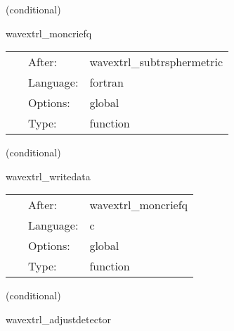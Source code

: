 \vspace{5mm}

   (conditional) 

\hspace{5mm} wavextrl\_moncriefq 

\hspace{5mm}{\it compute moncrief qeven, qodd from regge wheeler quantities } 


\hspace{5mm}

 \begin{tabular*}{160mm}{cll} 
~ & After:  & wavextrl\_subtrsphermetric \\ 
~ & Language:  & fortran \\ 
~ & Options:  & global \\ 
~ & Type:  & function \\ 
\end{tabular*} 


\vspace{5mm}

   (conditional) 

\hspace{5mm} wavextrl\_writedata 

\hspace{5mm}{\it write out results to disk and stdout - one file for each detector and (l,m) mode } 


\hspace{5mm}

 \begin{tabular*}{160mm}{cll} 
~ & After:  & wavextrl\_moncriefq \\ 
~ & Language:  & c \\ 
~ & Options:  & global \\ 
~ & Type:  & function \\ 
\end{tabular*} 


\vspace{5mm}

   (conditional) 

\hspace{5mm} wavextrl\_adjustdetector 

\hspace{5mm}{\it decrease current\_detector, go the the next detector } 


\hspace{5mm}

